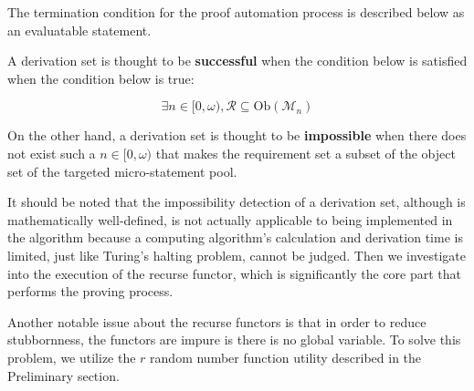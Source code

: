 \documentclass[preprint]{elsarticle}
\numberwithin{theorem}{section}	%
\numberwithin{axiom}{section}	%
\numberwithin{definition}{section}	%
\begin{document}
The termination condition for the proof automation process is described below as an evaluatable statement. 

\begin{definition}
	A derivation set is thought to be \textbf{ successful} when the condition below is satisfied when the condition below is true:
	
	\begin{equation}
		\exists n\in [0,\omega ), \mathcal{R}\subseteq \text{Ob}\left(\mathcal{M}_n\right)
	\end{equation}
	
	On the other hand, a derivation set is thought to be \textbf{ impossible} when there does not exist such a \(n\in [0,\omega )\) that makes the requirement set a subset of the object set of the targeted micro-statement pool.
\end{definition}

It should be noted that the impossibility detection of a derivation set, although is mathematically well-defined, is not actually applicable to being implemented in the algorithm because a computing algorithm{'}s calculation and derivation time is limited, just like Turing{'}s halting problem, cannot be judged. Then we investigate into the execution of the recurse functor, which is significantly the core part that performs the proving process.

Another notable issue about the recurse functors is that in order to reduce stubbornness, the functors are impure is there is no global variable. To solve this problem, we utilize the \(\mathit{r}\) random number function utility described in the Preliminary section.
\end{document}
